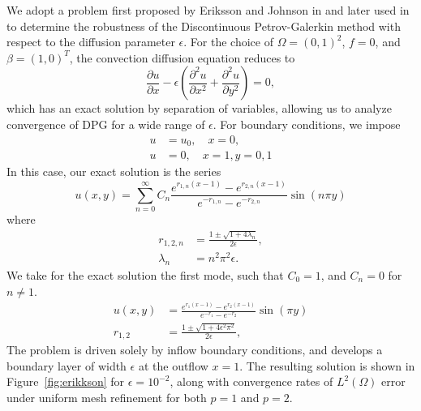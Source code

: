 \documentclass[final,leqno]{siamltex}
\newcommand{\LRp}[1]{\left( #1 \right)}
\renewcommand{\L}{L^2\LRp{\Omega}}
\newcommand{\pd}[2]{\frac{\partial#1}{\partial#2}}
\newcommand{\pdd}[2]{\frac{\partial^2#1}{\partial#2^2}}
\begin{document}
We adopt a problem first proposed by Eriksson and Johnson in \cite{Eriksson1993} and later used in \cite{DPGrobustness, DPGrobustness2} to determine the robustness of the Discontinuous Petrov-Galerkin method with respect to the diffusion parameter $\epsilon$. For the choice of $\Omega = (0,1)^2$, $f=0$, and $\beta = (1,0)^T$, the convection diffusion equation reduces to
\[
\pd{u}{x} - \epsilon \left(\pdd{u}{x}+ \pdd{u}{y}\right) = 0,
\]
which has an exact solution by separation of variables, allowing us to analyze convergence of DPG for a wide range of $\epsilon$. For boundary conditions, we impose
\begin{align*}
u &= u_0, \quad x=0,\\
u &= 0, \quad x=1, y = 0,1
\end{align*}
In this case, our exact solution is the series
\[
u(x,y) = \sum_{n=0}^\infty C_n \frac{e^{r_{1,n}(x-1)} - e^{r_{2,n}(x-1)}}{e^{-r_{1,n}} - e^{-r_{2,n}}} \sin (n\pi y)
\]
where
\begin{align*}
r_{1,2,n} &= \frac{1 \pm \sqrt{1 + 4 \lambda_n}}{2 \epsilon},\\
\lambda_n &= n^2\pi^2 \epsilon.
\end{align*}
We take for the exact solution the first mode, such that $C_0 = 1$, and $C_n = 0$ for $n\neq 1$.  
\begin{align*}
u(x,y) &= \frac{e^{r_{1}(x-1)} - e^{r_{2}(x-1)}}{e^{-r_{1}} - e^{-r_{2}}} \sin (\pi y)\\
r_{1,2} &= \frac{1 \pm \sqrt{1 + 4 \epsilon^2 \pi^2}}{2 \epsilon},
\end{align*}
The problem is driven solely by inflow boundary conditions, and develops a boundary layer of width $\epsilon$ at the outflow $x = 1$.  The resulting solution is shown in Figure~\ref{fig:erikkson} for $\epsilon = 10^{-2}$, along with convergence rates of $\L$ error under uniform mesh refinement for both $p=1$ and $p=2$.  
\end{document}
